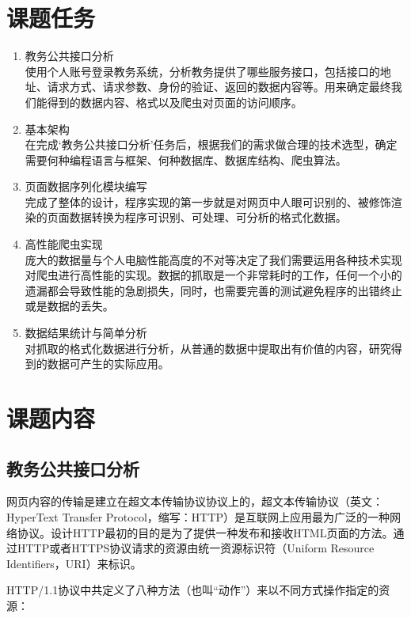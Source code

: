 \documentclass[UTF8, zihao=-4, heading=false]{ctexart}
\begin{document}
    \section{课题任务}
    \begin{enumerate}
        \item 教务公共接口分析\\
            使用个人账号登录教务系统，分析教务提供了哪些服务接口，包括接口的地址、请求方式、请求参数、身份的验证、返回的数据内容等。用来确定最终我们能得到的数据内容、格式以及爬虫对页面的访问顺序。
        \item 基本架构\\
            在完成‘教务公共接口分析’任务后，根据我们的需求做合理的技术选型，确定需要何种编程语言与框架、何种数据库、数据库结构、爬虫算法。
        \item 页面数据序列化模块编写\\
            完成了整体的设计，程序实现的第一步就是对网页中人眼可识别的、被修饰渲染的页面数据转换为程序可识别、可处理、可分析的格式化数据。
        \item 高性能爬虫实现\\
            庞大的数据量与个人电脑性能高度的不对等决定了我们需要运用各种技术实现对爬虫进行高性能的实现。数据的抓取是一个非常耗时的工作，任何一个小的遗漏都会导致性能的急剧损失，同时，也需要完善的测试避免程序的出错终止或是数据的丢失。
        \item 数据结果统计与简单分析\\
            对抓取的格式化数据进行分析，从普通的数据中提取出有价值的内容，研究得到的数据可产生的实际应用。
    \end{enumerate}
    
    \section{课题内容}
    \subsection{教务公共接口分析}
    网页内容的传输是建立在超文本传输协议协议上的，超文本传输协议（英文：HyperText Transfer Protocol，缩写：HTTP）是互联网上应用最为广泛的一种网络协议。设计HTTP最初的目的是为了提供一种发布和接收HTML页面的方法。通过HTTP或者HTTPS协议请求的资源由统一资源标识符（Uniform Resource Identifiers，URI）来标识。\cite{wiki:Hypertext_Transfer_Protocol}\par
    
    HTTP/1.1协议中共定义了八种方法（也叫“动作”）来以不同方式操作指定的资源：
        
\end{document}

